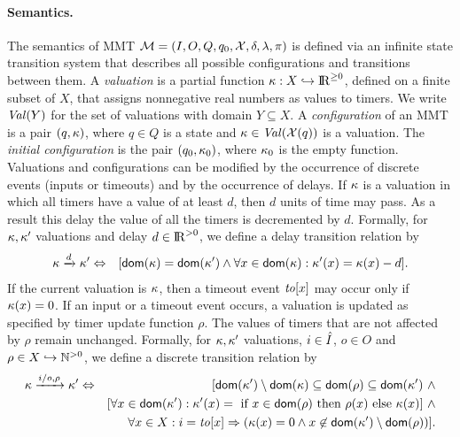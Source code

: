 \paragraph{Semantics.}
The semantics of MMT ${\cal M} = (I, O, Q, q_0, \mathcal{X}, \delta, \lambda, \pi)$ is defined via an infinite state transition system that describes all possible
configurations and transitions between them.
A \emph{valuation} is a partial function
$\kappa : X \hookrightarrow {\rm I\!R}^{\geq 0}$, defined on a finite subset of $X$, that assigns nonnegative real numbers as values to timers.
We write $\mathit{Val}({Y})$ for the set of valuations with domain $Y \subseteq X$.
A \emph{configuration} of an MMT is a pair $(q,\kappa)$, where $q \in Q$ is a state and $\kappa\in\mathit{Val}({\mathcal{X}(q)})$ is a valuation.
The \emph{initial configuration} is the pair $(q_0, \kappa_0)$, where $\kappa_0$ is the empty function.
Valuations and configurations can be modified by the occurrence of discrete events (inputs or timeouts) and by
the occurrence of delays.
If $\kappa$ is a valuation in which all timers
have a value of at least $d$, then $d$ units of time may pass. As a result this delay the value of all the timers is decremented by $d$.
Formally, for $\kappa, \kappa'$ valuations and delay $d \in {\rm I\!R}^{> 0}$, we define a delay transition relation by
\begin{eqnarray*}
\kappa \xrightarrow{d} \kappa' & \Leftrightarrow & [{\textsf{dom}}(\kappa) = {\textsf{dom}}(\kappa') \wedge \forall x \in{\textsf{dom}}(\kappa) : \kappa'(x) = \kappa(x) - d ].
\end{eqnarray*}
If the current valuation is $\kappa$, then a timeout event $\mathit{to}[x]$ may occur only if $\kappa(x)=0$.
If an input or a timeout event occurs, a valuation is updated as specified by timer update function $\rho$.
The values of timers that are not affected by $\rho$ remain unchanged.
Formally, for $\kappa, \kappa'$ valuations, $i \in \hat{I}$, $o \in O$ and $\rho \in X \hookrightarrow {\mathbb N}^{>0}$,
we define a discrete transition relation by
\begin{eqnarray*}
\kappa \xrightarrow{i/o, \rho}  \kappa' & \Leftrightarrow & [ {\textsf{dom}}(\kappa') \setminus {\textsf{dom}}(\kappa)  \subseteq {\textsf{dom}}(\rho) \subseteq {\textsf{dom}}(\kappa') ~ \wedge\\
&& [\forall x \in{\textsf{dom}}(\kappa') : \kappa'(x) = \mbox{ if } x \in{\textsf{dom}}(\rho) \mbox{ then } \rho(x) \mbox{ else } \kappa(x)] ~ \wedge\\
&& \forall x \in X : i=\mathit{to}[x] \Rightarrow (\kappa(x) = 0 \wedge x \not\in{\textsf{dom}}(\kappa') \setminus {\textsf{dom}}(\rho))].
\end{eqnarray*}
